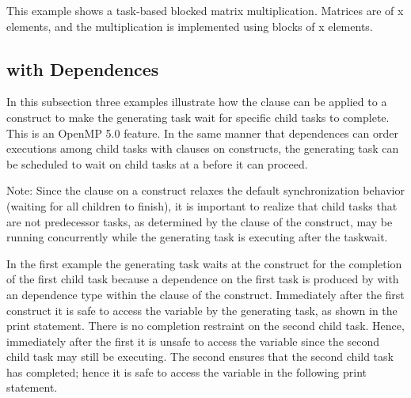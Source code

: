 This example shows a task-based blocked matrix multiplication. Matrices are of 
x elements, and the multiplication is implemented using blocks
of x elements.



\subsection{ with Dependences}
\label{subsec:taskwait_depend}

In this subsection three examples illustrate how the
 clause can be applied to a  construct to make the
generating task wait for specific child tasks to complete. This is an OpenMP 5.0 feature.
 In the same manner that
dependences can order executions among child tasks with  clauses on
 constructs, the generating task can be scheduled to wait on child tasks
at a  before it can proceed.

Note: Since the  clause on a  construct relaxes the
default synchronization behavior (waiting for all children to finish), it is important to
realize that child tasks that are not predecessor tasks, as determined by the 
clause of the  construct, may be running concurrently while the
generating task is executing after the taskwait.

In the first example the generating task waits at the  construct
for the completion of the first child task because a dependence on the first task
is produced by  with an  dependence type within the 
clause of the  construct.
Immediately after the first  construct it is safe to access the
 variable by the generating task, as shown in the print statement.
There is no completion restraint on the second child task.
Hence, immediately after the first  it is unsafe to access the
 variable since the second child task may still be executing.
The second  ensures that the second child task has completed; hence
it is safe to access the  variable in the following print statement.

